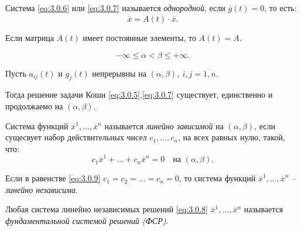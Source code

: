 \newpage

\begin{definition}
    Система \ref{eq:3.0.6} или \ref{eq:3.0.7} называется \emph{однородной}, если $ \overline{g}(t) = 0 $, то есть:
    \begin{equation}\label{eq:3.0.8}
        \dot{\overline{x}} = A(t) \cdot \overline{x}.
    \end{equation}

    Если матрица $ A(t) $ имеет постоянные элементы, то $ A(t) = A $.
\end{definition}

\begin{note}[$ (\alpha,\beta) $]
    \[
        -\infty \leqslant \alpha < \beta \leqslant + \infty.
    \]
\end{note}

\begin{theorem}
    Пусть $ a_{ij}(t) $ и $ g_j(t) $ непрерывны на $ (\alpha,\beta), \ i,j = \overline{1,n} $.

    Тогда решение задачи Коши \ref{eq:3.0.5},\ref{eq:3.0.7} существует, единственно и продолжаемо на $ (\alpha,\beta) $.
\end{theorem}

\begin{definition}
    Система функций $ \overline{x}^1,\ldots,\overline{x}^n $ называется \emph{линейно зависимой} на $ (\alpha,\beta) $, если сущесвует набор действительных чисел $ c_1,\ldots,c_n $, на всех равных нулю, такой, что:
    \begin{equation}\label{eq:3.0.9}
        c_1 \overline{x}^1 + \ldots + c_n \overline{x}^n = 0 \quad \text{на }(\alpha,\beta).
    \end{equation}
\end{definition}

\begin{definition}
    Если в равенстве \ref{eq:3.0.9} $ c_1 = c_2 = \ldots = c_n = 0 $, то система функций $ \overline{x}^1,\ldots,\overline{x}^n $ -- \emph{линейно независима}.
\end{definition}

\begin{definition}
    Любая система линейно независимых решений \ref{eq:3.0.8} $ \overline{x}^1,\ldots,\overline{x}^n $ называется \emph{фундаментальной системой решений (ФСР)}.
\end{definition}

